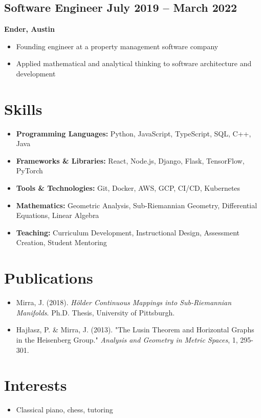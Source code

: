 \documentclass[11pt]{article}
\newcommand{\cventry}[3]{
  \subsection[#1]{#1 \hfill #2}
  #3
}
\begin{document}
\cventry{Software Engineer}{July 2019 -- March 2022}{
  \textbf{Ender, Austin}
  \begin{itemize}[leftmargin=*]
    \item Founding engineer at a property management software company
    \item Applied mathematical and analytical thinking to software architecture and development
  \end{itemize}
}

\section{Skills}
\begin{itemize}[leftmargin=*]
  \item \textbf{Programming Languages:} Python, JavaScript, TypeScript, SQL, C++, Java
  \item \textbf{Frameworks \& Libraries:} React, Node.js, Django, Flask, TensorFlow, PyTorch
  \item \textbf{Tools \& Technologies:} Git, Docker, AWS, GCP, CI/CD, Kubernetes
  \item \textbf{Mathematics:} Geometric Analysis, Sub-Riemannian Geometry, Differential Equations, Linear Algebra
  \item \textbf{Teaching:} Curriculum Development, Instructional Design, Assessment Creation, Student Mentoring
\end{itemize}

\section{Publications}
\begin{itemize}[leftmargin=*]
  \item Mirra, J. (2018). \emph{Hölder Continuous Mappings into Sub-Riemannian Manifolds}. Ph.D. Thesis, University of Pittsburgh.
  \item Hajłasz, P. \& Mirra, J. (2013). "The Lusin Theorem and Horizontal Graphs in the Heisenberg Group." \emph{Analysis and Geometry in Metric Spaces}, 1, 295-301.
\end{itemize}

\section{Interests}
\begin{itemize}[leftmargin=*]
  \item Classical piano, chess, tutoring
\end{itemize}
\end{document}
